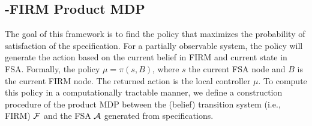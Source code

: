 \documentclass[conference]{IEEEtran}
\begin{document}
\subsection{\DTL-FIRM Product MDP}\label{sec:DTL-FIRM}
The goal of this framework is to find the policy that maximizes the probability of satisfaction of the \DTL specification. For a partially observable system, the policy will generate the action based on the current belief in FIRM and current state in FSA. Formally, the policy $\mu=\pi(s,B)$, where $s$ the current FSA node and $B$ is the current FIRM node. The returned action is the local controller $\mu$.
To compute this policy in a computationally tractable manner, we define a construction procedure of the product MDP between the (belief) transition system (i.e., FIRM) $\mathcal{F}$ and the FSA $\mathcal{A}$ generated from specifications.
\end{document}

